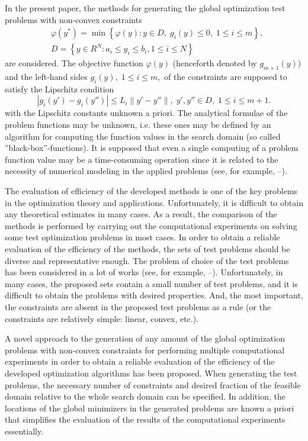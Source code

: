 \documentclass{llncs}
\begin{document}
In the present paper, the methods for generating the global optimization test problems with non-convex constraints
\begin{eqnarray}
&\varphi(y^\ast)=\min{\left\{\varphi(y):y\in D, \; g_i(y)\leq 0, \; 1 \leq i \leq m\right\}}, \label{i_problem} \\
&D=\left\{y\in R^N: a_i\leq y_i \leq b_i, 1\leq i \leq N\right\} \label{D}
\end{eqnarray}
are considered. The objective function $\varphi(y)$ (henceforth denoted by $g_{m+1}(y)$) and the left-hand sides $g_i(y), \; 1\leq i \leq m,$ of the constraints are supposed to satisfy the Lipschitz condition
\[ \left|g_i(y')-g_i (y'')\right| \leq L_i \left\|y'-y'' \right\|, \; y',y''\in D, \; 1\leq i \leq m+1. \]
with the Lipschitz constants unknown a priori. The analytical formulae of the problem functions may be unknown, i.e. these ones may be defined by an algorithm for computing the function values in the search domain (so called ''black-box''-functions). It is supposed that even a single computing of a problem function value may be a time-consuming operation since it is related to the necessity of numerical modeling in the applied problems (see, for example, \cite{Famularo}--\cite{Modorskii}).

The evaluation of efficiency of the developed methods is one of the key problems in the optimization theory and applications. Unfortunately, it is difficult to obtain any theoretical estimates in many cases. As a result, the comparison of the methods is performed by carrying out the computational experiments on solving some test optimization problems in most cases. In order to obtain a reliable evaluation of the efficiency of the methods, the sets of test problems should be diverse and representative enough. The problem of choice of the test problems has been considered in a lot of works (see, for example, \cite{Floudas}--\cite{Addis}). Unfortunately, in many cases, the proposed sets contain a small number of test problems, and it is difficult to obtain the problems with desired properties. And, the most important, the constraints are absent in the proposed test problems as a rule (or the constraints are relatively simple: linear, convex, etc.).

A novel approach to the generation of any amount of the global optimization problems with non-convex constraints for performing multiple computational experiments in order to obtain a reliable evaluation of the efficiency of the developed optimization algorithms has been proposed. When generating the test problems, the necessary number of constraints and desired fraction of the feasible domain relative to the whole search domain can be specified. In addition, the locations of the global minimizers in the generated problems are known a priori that simplifies the evaluation of the results of the computational experiments essentially.
\end{document}
